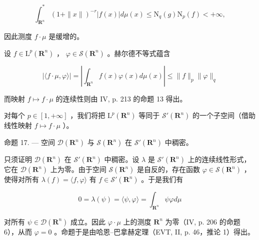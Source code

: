 \[
\int_ {\mathbf {R} ^ {n}} ^ {*} (1 + \| x \|) ^ {- r} | f (x) | d \mu (x) \leqslant \mathrm{N} _ {q} (g) \mathrm{N} _ {p} (f) <   + \infty ,
\]

因此测度 \(f \cdot \mu\) 是缓增的。

设 \(f \in \mathrm{L}^p(\mathbf{R}^n)\) ， \(\varphi \in \mathcal{S}(\mathbf{R}^n)\) 。赫尔德不等式蕴含

\[
| \langle f \cdot \mu , \varphi \rangle | = \left| \int_ {\mathbf {R} ^ {n}} f (x) \varphi (x) d \mu (x) \right| \leqslant \| f \| _ {p} \| \varphi \| _ {q}
\]

而映射 \(f \mapsto f \cdot \mu\) 的连续性则由 IV, p. 213 的命题 13 得出。

对每个 \(p \in [1, +\infty]\) ，我们将把 \(\mathrm{L}^p(\mathbf{R}^n)\) 等同于 \(\mathcal{S}'(\mathbf{R}^n)\) 的一个子空间（借助线性映射 \(f \mapsto f \cdot \mu\) ）。

命题 17. --- 空间 \(\mathcal{D}(\mathbf{R}^{n})\) 与 \(\mathcal{S}(\mathbf{R}^{n})\) 在 \(\mathcal{S}'(\mathbf{R}^{n})\) 中稠密。

只须证明 \(\mathcal{D}(\mathbf{R}^{n})\) 在 \(\mathcal{S}'(\mathbf{R}^{n})\) 中稠密。设 \(\lambda\) 是 \(\mathcal{S}'(\mathbf{R}^{n})\) 上的连续线性形式，它在 \(\mathcal{D}(\mathbf{R}^{n})\) 上为零。由于空间 \(\mathcal{S}(\mathbf{R}^{n})\) 是自反的，存在函数 \(\varphi \in \mathcal{S}(\mathbf{R}^{n})\) ，使得对所有 \(\lambda(f) = \langle f, \varphi \rangle\) 有 \(f \in \mathcal{S}'(\mathbf{R}^{n})\) 。于是我们有

\[
0 = \lambda (\psi) = \langle \psi , \varphi \rangle = \int_ {\mathbf {R} ^ {n}} \psi \varphi d \mu
\]

对所有 \(\psi\in\mathcal{D}(\mathbf{R}^{n})\) 成立。因此 \(\varphi\cdot\mu\) 上的测度 \(\mathbf{R}^{n}\) 为零（IV, p. 206 的命题 6），从而 \(\varphi=0\) 。命题于是由哈恩–巴拿赫定理（EVT, II, p. 46，推论 1）得出。

